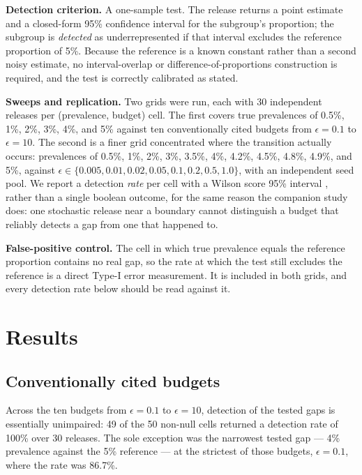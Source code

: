 \documentclass[11pt]{article}
\begin{document}
\textbf{Detection criterion.} A one-sample test. The release returns a point estimate and a closed-form 95\% confidence interval for the subgroup's proportion; the subgroup is \emph{detected} as underrepresented if that interval excludes the reference proportion of 5\%. Because the reference is a known constant rather than a second noisy estimate, no interval-overlap or difference-of-proportions construction is required, and the test is correctly calibrated as stated.

\textbf{Sweeps and replication.} Two grids were run, each with 30 independent releases per (prevalence, budget) cell. The first covers true prevalences of 0.5\%, 1\%, 2\%, 3\%, 4\%, and 5\% against ten conventionally cited budgets from $\epsilon = 0.1$ to $\epsilon = 10$. The second is a finer grid concentrated where the transition actually occurs: prevalences of 0.5\%, 1\%, 2\%, 3\%, 3.5\%, 4\%, 4.2\%, 4.5\%, 4.8\%, 4.9\%, and 5\%, against $\epsilon \in \{0.005, 0.01, 0.02, 0.05, 0.1, 0.2, 0.5, 1.0\}$, with an independent seed pool. We report a detection \emph{rate} per cell with a Wilson score 95\% interval \cite{wilson1927}, rather than a single boolean outcome, for the same reason the companion study does: one stochastic release near a boundary cannot distinguish a budget that reliably detects a gap from one that happened to.

\textbf{False-positive control.} The cell in which true prevalence equals the reference proportion contains no real gap, so the rate at which the test still excludes the reference is a direct Type-I error measurement. It is included in both grids, and every detection rate below should be read against it.

\section{Results}

\subsection{Conventionally cited budgets}

Across the ten budgets from $\epsilon = 0.1$ to $\epsilon = 10$, detection of the tested gaps is essentially unimpaired: 49 of the 50 non-null cells returned a detection rate of 100\% over 30 releases. The sole exception was the narrowest tested gap --- 4\% prevalence against the 5\% reference --- at the strictest of those budgets, $\epsilon = 0.1$, where the rate was 86.7\%.
\end{document}
